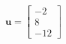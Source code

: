 \documentclass[preview]{standalone}
\begin{document}
\begin{align*}
\mathbf{u} = \begin{bmatrix}-2 \\ 8 \\ -12\end{bmatrix}
\end{align*}
\end{document}
